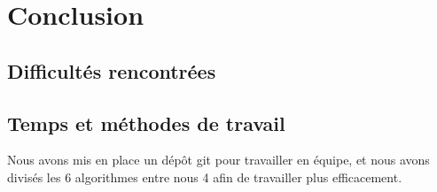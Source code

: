 \documentclass{scrreprt}
\begin{document}
\chapter{Conclusion}


\section{Difficultés rencontrées}

\section{Temps et méthodes de travail}
Nous avons mis en place un dépôt git pour travailler en équipe, et nous avons divisés les 6 algorithmes entre nous 4 afin de travailler plus efficacement.
\end{document}
